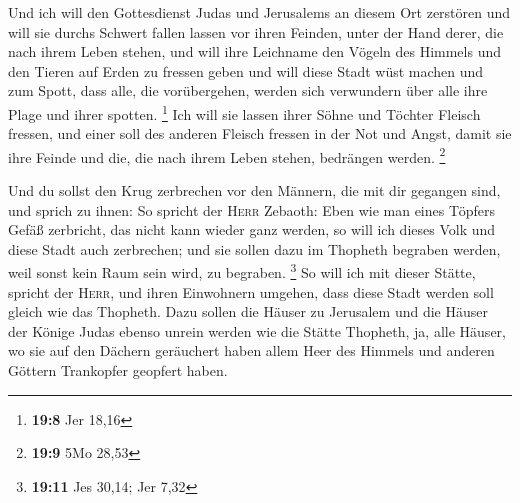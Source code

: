  Und ich will den Gottesdienst Judas und Jerusalems an
diesem Ort zerstören und will sie durchs Schwert fallen lassen vor ihren
Feinden, unter der Hand derer, die nach ihrem Leben stehen, und will
ihre Leichname den Vögeln des Himmels und den Tieren auf Erden zu
fressen geben  und will diese Stadt wüst machen und zum
Spott, dass alle, die vorübergehen, werden sich verwundern über alle
ihre Plage und ihrer spotten. \footnote{\textbf{19:8} Jer 18,16}
 Ich will sie lassen ihrer Söhne und Töchter Fleisch
fressen, und einer soll des anderen Fleisch fressen in der Not und
Angst, damit sie ihre Feinde und die, die nach ihrem Leben stehen,
bedrängen werden. \footnote{\textbf{19:9} 5Mo 28,53}

 Und du sollst den Krug zerbrechen vor den Männern, die
mit dir gegangen sind,  und sprich zu ihnen: So spricht
der \textsc{Herr} Zebaoth: Eben wie man eines Töpfers Gefäß zerbricht,
das nicht kann wieder ganz werden, so will ich dieses Volk und diese
Stadt auch zerbrechen; und sie sollen dazu im Thopheth begraben werden,
weil sonst kein Raum sein wird, zu begraben. \footnote{\textbf{19:11}
  Jes 30,14; Jer 7,32}  So will ich mit dieser Stätte,
spricht der \textsc{Herr}, und ihren Einwohnern umgehen, dass diese
Stadt werden soll gleich wie das Thopheth.  Dazu sollen
die Häuser zu Jerusalem und die Häuser der Könige Judas ebenso unrein
werden wie die Stätte Thopheth, ja, alle Häuser, wo sie auf den Dächern
geräuchert haben allem Heer des Himmels und anderen Göttern Trankopfer
geopfert haben.

